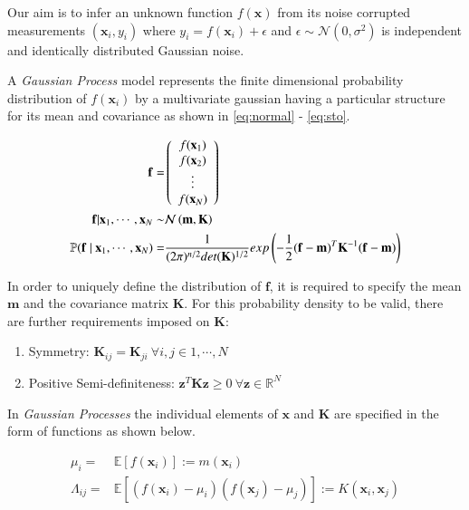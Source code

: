 \documentclass{article}
\begin{document}
Our aim is to infer an unknown function $f(\mathbf{x})$ from its noise corrupted measurements $(\mathbf{x}_i, y_i)$ where $y_i = f(\mathbf{x}_i) + \epsilon$ and $\epsilon \sim \mathcal{N}(0, \sigma^2)$ is independent and identically distributed Gaussian noise.

A \emph{Gaussian Process} model represents the finite dimensional probability distribution of $f(\mathbf{x}_i)$ by a multivariate gaussian having a particular structure for its mean and covariance as shown in \ref{eq:normal} - \ref{eq:sto}.

\begin{align}
  \mathbf{f} = & \left( \begin{array}{c} f(\mathbf{x}_1) \\ f(\mathbf{x}_2) \\ \vdots \\ f(\mathbf{x}_N) \end{array} \right) \label{eq:fvalues}\\
  \vspace{2\baselineskip}
  \mathbf{f} | \mathbf{x}_1, \cdots, \mathbf{x}_N \sim & \mathcal{N}\left( \mathbf{m}, \mathbf{K} \right)  \label{eq:normal}\\
  \vspace{2\baselineskip}
  \mathbb{P}( \mathbf{f} \ | \ \mathbf{x}_1, \cdots, \mathbf{x}_N) = & \frac{1}{(2\pi)^{n/2} det(\mathbf{K})^{1/2}} exp \left(-\frac{1}{2} (\mathbf{f} - \mathbf{m})^T \mathbf{K}^{-1} (\mathbf{f} - \mathbf{m}) \right) \label{eq:sto}
\end{align}

In order to uniquely define the distribution of $\mathbf{f}$, it is
required to specify the mean $\mathbf{m}$ and the covariance matrix
$\mathbf{K}$. For this probability density to be valid, there are further requirements imposed on $\mathbf{K}$: 

\begin{enumerate}
\item Symmetry: $\mathbf{K}_{ij} = \mathbf{K}_{ji} \ \forall i,j \in {1, \cdots, N} $ 
\item Positive Semi-definiteness: $\mathbf{z}^T \mathbf{K} \mathbf{z} \geq 0 \ \forall \mathbf{z} \in \mathbb{R}^N$  
\end{enumerate}

In \emph{Gaussian Processes} the individual elements of $\mathbf{x}$ and $\mathbf{K}$ are specified in the form of functions as shown below.

\begin{align}
  \mu_i = & \mathbb{E}[f(\mathbf{x}_i)] := m(\mathbf{x}_i) \\
  \Lambda_{ij} = & \mathbb{E}[(f(\mathbf{x}_i) - \mu_i)(f(\mathbf{x}_j) - \mu_j)] := K(\mathbf{x}_i, \mathbf{x}_j)
\end{align}
\end{document}
